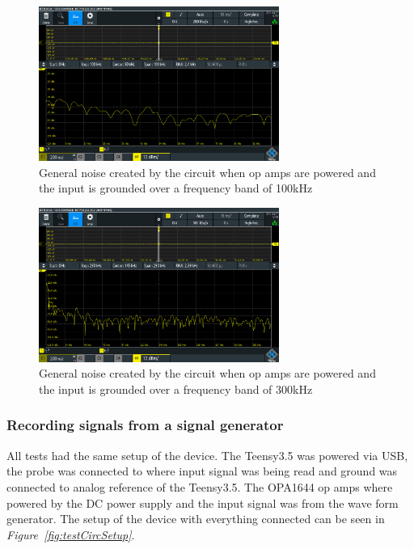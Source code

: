 \begin{figure}[h]
    \centering
    \includegraphics[width=0.7\textwidth]{graphics/NoiseFloor100k.PNG}
    \caption{General noise created by the circuit when op amps are powered and the input is grounded over a frequency band of 100kHz}
    \label{fig:noisefloor100k}
\end{figure}

\begin{figure}[h]
    \centering
    \includegraphics[width=0.7\textwidth]{graphics/NoiseFloor300k.PNG}
    \caption{General noise created by the circuit when op amps are powered and the input is grounded over a frequency band of 300kHz}
    \label{fig:noisefloor300k}
\end{figure}




\clearpage



\subsubsection{Recording signals from a signal generator}

All tests had the same setup of the device.
The Teensy3.5 was powered via USB, the probe was connected to where input signal was being read and ground was connected to analog reference of the Teensy3.5.
The OPA1644 op amps where powered by the DC power supply and the input signal was from the wave form generator.
The setup of the device with everything connected can be seen in \textit{Figure~\ref{fig:testCircSetup}}.

